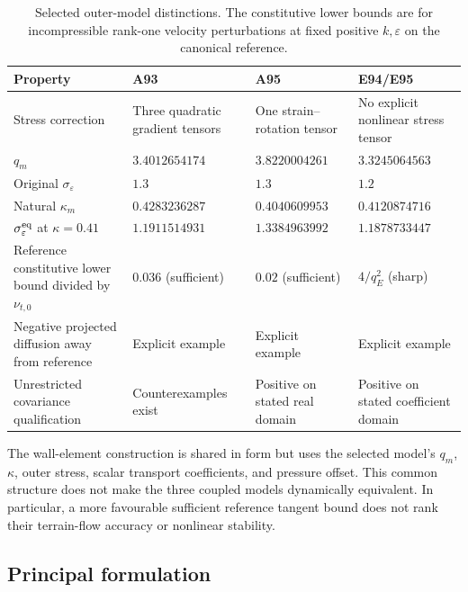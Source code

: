 \documentclass[11pt,a4paper]{article}
\numberwithin{equation}{section}
\newcommand{\eps}{\varepsilon}
\begin{document}
\begin{table}[htbp]
\centering\small
\caption{Selected outer-model distinctions. The constitutive lower bounds
are for incompressible rank-one velocity perturbations at fixed positive
$k,\eps$ on the canonical reference.}
\label{tab:comparison}
\begin{tabularx}{\textwidth}{@{}>{\raggedright\arraybackslash}p{}YYY@{}}
\toprule
Property&A93&A95&E94/E95\\
\midrule
Stress correction & Three quadratic gradient tensors &
One strain--rotation tensor & No explicit nonlinear stress tensor\\
$q_m$ & $3.4012654174$ & $3.8220004261$ & $3.3245064563$\\
Original $\sigma_\eps$ & $1.3$ & $1.3$ & $1.2$\\
Natural $\kappa_m$ & $0.4283236287$ & $0.4040609953$ &
$0.4120874716$\\
$\sigma_\eps^{\rm eq}$ at $\kappa=0.41$ &
$1.1911514931$ & $1.3384963992$ & $1.1878733447$\\
Reference constitutive lower bound divided by $\nu_{t,0}$ &
$0.036$ (sufficient) & $0.02$ (sufficient) &
$4/q_E^2$ (sharp)\\
Negative projected diffusion away from reference &
Explicit example & Explicit example & Explicit example\\
Unrestricted covariance qualification &
Counterexamples exist & Positive on stated real domain &
Positive on stated coefficient domain\\
\bottomrule
\end{tabularx}
\end{table}

The wall-element construction is shared in form but uses the selected
model's $q_m$, $\kappa$, outer stress, scalar transport coefficients,
and pressure offset. This common structure does not make the three
coupled models dynamically equivalent. In particular, a more
favourable sufficient reference tangent bound does not rank their
terrain-flow accuracy or nonlinear stability.

\subsection{Principal formulation}
\end{document}

